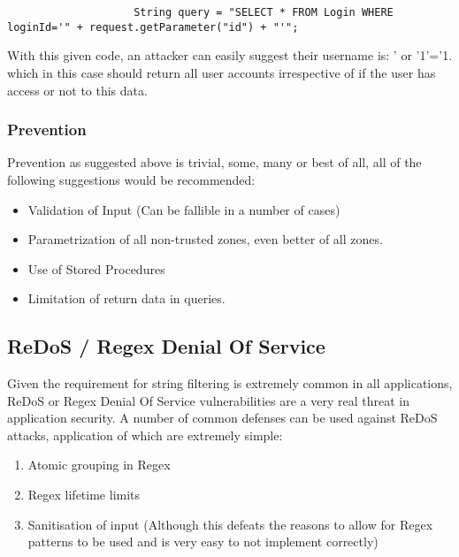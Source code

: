 \documentclass{IEEEtran}
\begin{document}
                \lstset{style=sharpc}
                \begin{lstlisting}
                    String query = "SELECT * FROM Login WHERE loginId='" + request.getParameter("id") + "'";
                \end{lstlisting}

                With this given code, an attacker can easily suggest their username is:
                ' or '1'='1. which in this case should return all user accounts 
                irrespective of if the user has access or not to this data.

            \subsubsection{Prevention}
                Prevention as suggested above is trivial, some, many or best of all, all 
                of the following suggestions would be recommended:
                \begin{itemize}
                    \item Validation of Input (Can be fallible in a number of cases)
                    \item Parametrization of all non-trusted zones, even better of all
                    zones.
                    \item Use of Stored Procedures
                    \item Limitation of return data in queries.
                \end{itemize}

        \newpage
        \subsection{ReDoS / Regex Denial Of Service}
            Given the requirement for string filtering is extremely common in all applications,
            ReDoS or Regex Denial Of Service\cite{ReDoS} vulnerabilities are a very real threat in application security.
            A number of common defenses can be used against ReDoS attacks, application of 
            which are extremely simple:
            \begin{enumerate}
                \item Atomic grouping in Regex
                \item Regex lifetime limits
                \item Sanitisation of input (Although this defeats the reasons to allow for
                Regex patterns to be used and is very easy to not implement correctly)
            \end{enumerate}
\end{document}
